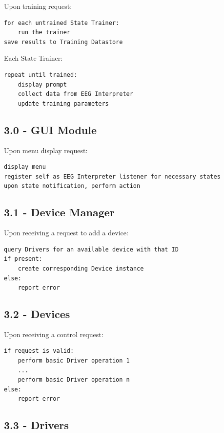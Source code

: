 \documentclass{article}
\begin{document}
Upon training request:

\begin{lstlisting}
for each untrained State Trainer:
    run the trainer
save results to Training Datastore
\end{lstlisting}

Each State Trainer:

\begin{lstlisting}
repeat until trained:
    display prompt
    collect data from EEG Interpreter
    update training parameters
\end{lstlisting}

\subsection*{3.0 - GUI Module}

Upon menu display request:

\begin{lstlisting}
display menu
register self as EEG Interpreter listener for necessary states
upon state notification, perform action
\end{lstlisting}

\subsection*{3.1 - Device Manager}

Upon receiving a request to add a device:

\begin{lstlisting}
query Drivers for an available device with that ID
if present:
    create corresponding Device instance
else:
    report error
\end{lstlisting}

\subsection*{3.2 - Devices}

Upon receiving a control request:

\begin{lstlisting}
if request is valid:
    perform basic Driver operation 1
    ...
    perform basic Driver operation n
else:
    report error
\end{lstlisting}

\subsection*{3.3 - Drivers}
\end{document}
